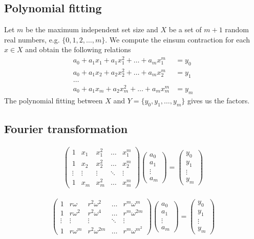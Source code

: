 \documentclass{article}
\newcommand{\<}{\langle}
\renewcommand{\>}{\rangle}
\theoremstyle{definition}\newtheorem{definition}{\textit{Definition}}
\begin{document}
\subsection{Polynomial fitting}
Let $m$ be the maximum independent set size and $X$ be a set of $m+1$ random real numbers, e.g. $\{0, 1, 2, \ldots, m\}$.
We compute the einsum contraction for each $x \in X$ and obtain the following relations
\begin{align}
a_0 + a_1 x_1 + a_1 x_1^2 + \ldots + a_m x_1^m &= y_0\\
a_0 + a_1 x_2 + a_2 x_2^2 + \ldots + a_m x_2^m &= y_1\\
\ldots&\\
a_0 + a_1 x_m + a_2 x_m^2 + \ldots + a_m x_m^m& = y_m
\end{align}
The polynomial fitting between $X$ and $Y = \{y_0, y_1, \ldots, y_m\}$ gives us the factors.

\subsection{Fourier transformation}
\begin{align}
\left(\begin{matrix}
1 & x_1 & x_1^2 & \ldots & x_1^m \\
1 & x_2 & x_2^2 & \ldots & x_2^m \\
\vdots & \vdots & \vdots &\ddots & \vdots \\
1 & x_m & x_m^2 & \ldots & x_m^m
\end{matrix}\right)
\left(\begin{matrix}
a_0 \\ a_1 \\ \vdots \\ a_m
\end{matrix}\right)
= \left(\begin{matrix}
y_0 \\ y_1 \\ \vdots \\ y_m
\end{matrix}\right)
\end{align}

\begin{align}
\left(\begin{matrix}
1 & r\omega & r^2\omega^2 & \ldots & r^m\omega^m \\
1 & r\omega^2 & r^2\omega^4 & \ldots & r^m\omega^{2m} \\
\vdots & \vdots & \vdots &\ddots & \vdots \\
1 & r\omega^m & r^2\omega^{2m} & \ldots & r^m\omega^{m^2}
\end{matrix}\right)
\left(\begin{matrix}
a_0 \\ a_1 \\ \vdots \\ a_m
\end{matrix}\right)
= \left(\begin{matrix}
y_0 \\ y_1 \\ \vdots \\ y_m
\end{matrix}\right)
\end{align}
\end{document}
